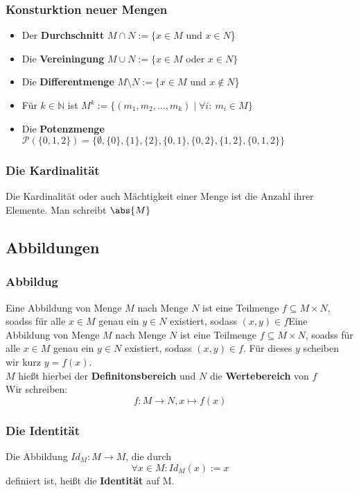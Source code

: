 \documentclass{kit}
\begin{document}
    \subsubsection{Konsturktion neuer Mengen}
      \begin{itemize}
        \item Der \textbf{Durchschnitt} $M\cap N:=\{x\in M$ und $x\in N$\}
        \item Die \textbf{Vereiningung} $M\cup N:=\{x\in M$ oder $x\in N\}$
        \item Die \textbf{Differentmenge} $M\setminus N:=\{x\in M$ und $x\notin N$\}
        \item Für $k\in\mathbb{N}$ ist $M^k:=\{(m_1,m_2,\dots,m_k)\mid \forall i:\ m_i\in M\}$
        \item Die \textbf{Potenzmenge} $\mathcal{P}(\{0,1,2\})=\{\emptyset,\{0\},\{1\},\{2\},\{0,1\},\{0,2\},\{1,2\},\{0,1,2\}\}$
      \end{itemize}
    \subsubsection{Die Kardinalität}
    Die Kardinalität oder auch Mächtigkeit einer Menge ist die Anzahl ihrer Elemente. Man schreibt $\abs{M}$
  \subsection{Abbildungen}
    \subsubsection{Abbildug}
      Eine Abbildung von Menge $M$ nach Menge $N$ ist eine Teilmenge $f\subseteq M\times N$, soadss für alle $x\in M$ genau ein $y\in N$ existiert, 
      sodass $(x,y)\in f$Eine Abbildung von Menge $M$ nach Menge $N$ ist eine Teilmenge $f\subseteq M\times N$, 
      soadss für alle $x\in M$ genau ein $y\in N$ existiert, sodass $(x,y)\in f$. Für dieses $y$ scheiben wir kurz $y=f(x)$.\\
      $M$ hießt hierbei der \textbf{Definitonsbereich} und $N$ die \textbf{Wertebereich} von $f$\\
      Wir schreiben: \[f:M\longrightarrow N, x\mapsto f(x)\]
    \subsubsection{Die Identität}
      Die Abbildung $Id_M:M\longrightarrow M$, die durch 
      \[\forall x\in M:Id_M(x):=x\]
      definiert ist, heißt die \textbf{Identität} auf M.
\end{document}
